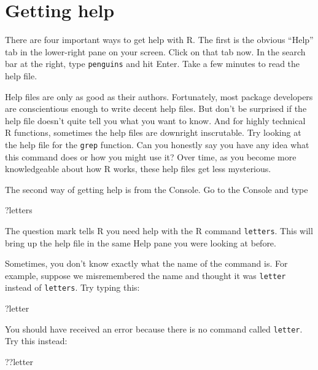 \documentclass[
]{book}
\newenvironment{Shaded}{\begin{snugshade}}{\end{snugshade}}
\newcommand{\NormalTok}[1]{#1}
\begin{document}
\hypertarget{intror-gettinghelp}{%
\section{Getting help}\label{intror-gettinghelp}}

There are four important ways to get help with R. The first is the obvious ``Help'' tab in the lower-right pane on your screen. Click on that tab now. In the search bar at the right, type \texttt{penguins} and hit Enter. Take a few minutes to read the help file.

Help files are only as good as their authors. Fortunately, most package developers are conscientious enough to write decent help files. But don't be surprised if the help file doesn't quite tell you what you want to know. And for highly technical R functions, sometimes the help files are downright inscrutable. Try looking at the help file for the \texttt{grep} function. Can you honestly say you have any idea what this command does or how you might use it? Over time, as you become more knowledgeable about how R works, these help files get less mysterious.

The second way of getting help is from the Console. Go to the Console and type

\begin{Shaded}
\begin{Highlighting}[]
\NormalTok{?letters}
\end{Highlighting}
\end{Shaded}

The question mark tells R you need help with the R command \texttt{letters}. This will bring up the help file in the same Help pane you were looking at before.

Sometimes, you don't know exactly what the name of the command is. For example, suppose we misremembered the name and thought it was \texttt{letter} instead of \texttt{letters}. Try typing this:

\begin{Shaded}
\begin{Highlighting}[]
\NormalTok{?letter}
\end{Highlighting}
\end{Shaded}

You should have received an error because there is no command called \texttt{letter}. Try this instead:

\begin{Shaded}
\begin{Highlighting}[]
\NormalTok{??letter}
\end{Highlighting}
\end{Shaded}
\end{document}
